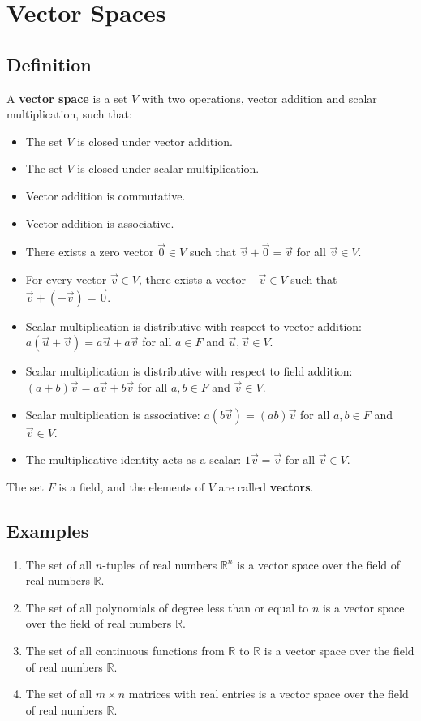\section{Vector Spaces}

\subsection{Definition}

A \textbf{vector space} is a set \(V\) with two operations, vector addition and scalar multiplication, such that:

\begin{itemize}[label=\(-\)]
	\item The set \(V\) is closed under vector addition.
	\item The set \(V\) is closed under scalar multiplication.
	\item Vector addition is commutative.
	\item Vector addition is associative.
	\item There exists a zero vector \(\vec{0} \in V\) such that \(\vec{v} + \vec{0} = \vec{v}\) for all \(\vec{v} \in V\).
	\item For every vector \(\vec{v} \in V\), there exists a vector \(-\vec{v} \in V\) such that \(\vec{v} + (-\vec{v}) = \vec{0}\).
	\item Scalar multiplication is distributive with respect to vector addition: \(a(\vec{u} + \vec{v}) = a\vec{u} + a\vec{v}\) for all \(a \in F\) and \(\vec{u}, \vec{v} \in V\).
	\item Scalar multiplication is distributive with respect to field addition: \((a + b)\vec{v} = a\vec{v} + b\vec{v}\) for all \(a, b \in F\) and \(\vec{v} \in V\).
	\item Scalar multiplication is associative: \(a(b\vec{v}) = (ab)\vec{v}\) for all \(a, b \in F\) and \(\vec{v} \in V\).
	\item The multiplicative identity acts as a scalar: \(1\vec{v} = \vec{v}\) for all \(\vec{v} \in V\).
\end{itemize}
The set \(F\) is a field, and the elements of \(V\) are called \textbf{vectors}.

\subsection{Examples}

\begin{enumerate}
	\item The set of all \(n\)-tuples of real numbers \(\mathbb{R}^n\) is a vector space over the field of real numbers \(\mathbb{R}\).
	\item The set of all polynomials of degree less than or equal to \(n\) is a vector space over the field of real numbers \(\mathbb{R}\).
	\item The set of all continuous functions from \(\mathbb{R}\) to \(\mathbb{R}\) is a vector space over the field of real numbers \(\mathbb{R}\).
	\item The set of all \(m \times n\) matrices with real entries is a vector space over the field of real numbers \(\mathbb{R}\).
\end{enumerate}

